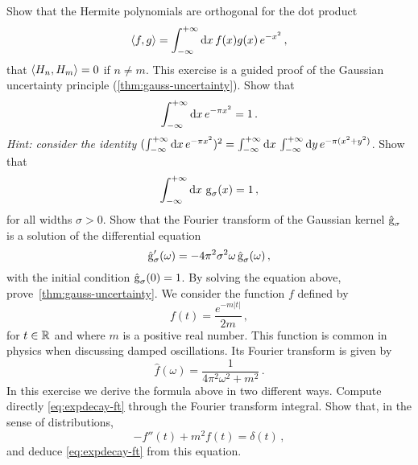 \begin{ExerciseList}
  \Question Show that the Hermite polynomials are orthogonal for the dot product
  \begin{equation}
    \braket{f,g}=\int_{-\infty}^{+\infty}\mathrm{d}{x}\,f(x)g(x)\,e^{-x^2}\,,
  \end{equation}
  \ie that $\braket{H_n,H_m}=0$ if $n\neq m$.
  \Exercise[label=gauss-uncertainty]
  This exercise is a guided proof of the
  Gaussian uncertainty principle (\cref{thm:gauss-uncertainty}).
  \Question Show that
  \begin{equation}
    \int_{-\infty}^{+\infty}\mathrm{d}{x}\,e^{-\pi x^2}=1\,.
  \end{equation}
  \emph{Hint: consider the identity }
  $(\int_{-\infty}^{+\infty}\mathrm{d}{x}\,e^{-\pi x^2})^2=\int_{-\infty}^{+\infty}\mathrm{d}{x}\,\int_{-\infty}^{+\infty}\mathrm{d}{y}\,e^{-\pi (x^2+y^2)}$.
  \Question Show that
  \begin{equation}
    \int_{-\infty}^{+\infty}\mathrm{d}{x}\,\operatorname{g}_{\sigma}(x)=1\,,
  \end{equation}
  for all widths $\sigma>0$.
  \Question Show that the Fourier transform of the Gaussian kernel $\hat{\operatorname{g}}_{\sigma}$
  is a solution of the differential equation
  \begin{equation}
    \hat{\operatorname{g}}_{\sigma}'(\omega)=-4\pi^2\sigma^2\omega\,\hat{\operatorname{g}}_{\sigma}(\omega)\,,
  \end{equation}
  with the initial condition $\hat{\operatorname{g}}_{\sigma}(0)=1$.
  \Question By solving the equation above, prove~\cref{thm:gauss-uncertainty}.
  \Exercise[label=exp-decay]
  We consider the function $f$ defined by
  \begin{equation}
    f(t)=\frac{e^{-m|t|}}{2m}\,,
  \end{equation}
  for $t\in\mathbb{R}$ and where $m$ is a positive real number. This function is common in physics
  when discussing damped oscillations. Its Fourier transform is given by
  \begin{equation}
    \hat{f}(\omega)=\frac{1}{4\pi^2\omega^2+m^2}\,.
    \label{eq:expdecay-ft}
  \end{equation}
  In this exercise we derive the formula above in two different ways.
  \Question Compute directly \cref{eq:expdecay-ft} through the Fourier transform integral.
  \Question Show that, in the sense of distributions,
  \begin{equation}
    -f''(t)+m^2f(t)=\delta(t)\,,
  \end{equation}
  and deduce \cref{eq:expdecay-ft} from this equation.
\end{ExerciseList}